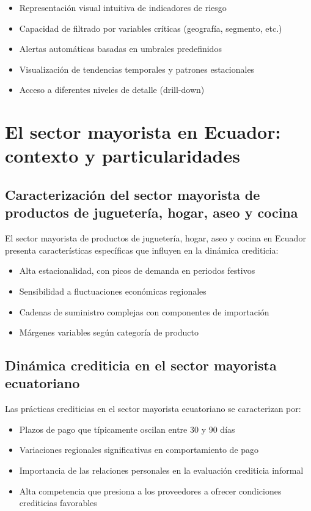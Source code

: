 \begin{itemize}
    \item Representación visual intuitiva de indicadores de riesgo
    \item Capacidad de filtrado por variables críticas (geografía, segmento, etc.)
    \item Alertas automáticas basadas en umbrales predefinidos
    \item Visualización de tendencias temporales y patrones estacionales
    \item Acceso a diferentes niveles de detalle (drill-down)
\end{itemize}

\section{El sector mayorista en Ecuador: contexto y particularidades}
\subsection{Caracterización del sector mayorista de productos de juguetería, hogar, aseo y cocina}
El sector mayorista de productos de juguetería, hogar, aseo y cocina en Ecuador presenta características específicas que influyen en la dinámica crediticia:

\begin{itemize}
    \item Alta estacionalidad, con picos de demanda en periodos festivos
    \item Sensibilidad a fluctuaciones económicas regionales
    \item Cadenas de suministro complejas con componentes de importación
    \item Márgenes variables según categoría de producto
\end{itemize}

\subsection{Dinámica crediticia en el sector mayorista ecuatoriano}
Las prácticas crediticias en el sector mayorista ecuatoriano se caracterizan por:

\begin{itemize}
    \item Plazos de pago que típicamente oscilan entre 30 y 90 días
    \item Variaciones regionales significativas en comportamiento de pago
    \item Importancia de las relaciones personales en la evaluación crediticia informal
    \item Alta competencia que presiona a los proveedores a ofrecer condiciones crediticias favorables
\end{itemize}

